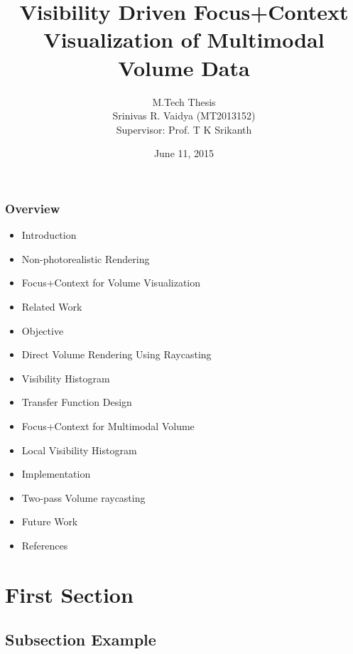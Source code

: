 \documentclass{beamer}
\title[]{Visibility Driven Focus+Context Visualization of
Multimodal Volume Data} %
\author{M.Tech Thesis \\Srinivas R. Vaidya (MT2013152) \\
Supervisor: Prof. T K Srikanth } %
\institute[IIITB] %
{International Institute Of Information Technology, Bangalore \\ %
\medskip
\textit{} %
}
\date{June 11, 2015} %
\begin{document}
\begin{frame}
\titlepage %
\end{frame}

\begin{frame}
\frametitle{Overview} %
\begin{itemize}
\item Introduction
\item Non-photorealistic Rendering
\item Focus+Context for Volume Visualization
\item Related Work
\item Objective
\item Direct Volume Rendering Using Raycasting
\item Visibility Histogram
\item Transfer Function Design
\item Focus+Context for Multimodal Volume
\item Local Visibility Histogram
\item Implementation
\item Two-pass Volume raycasting
\item Future Work
\item References
\end{itemize}
\end{frame}


\section{First Section} %

\subsection{Subsection Example} %
\end{document}
